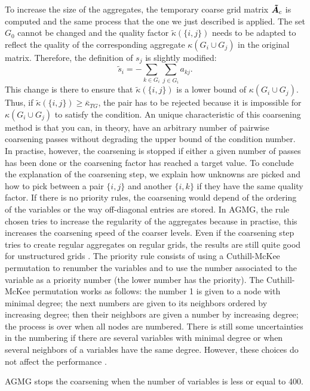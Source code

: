 To increase the size of the aggregates, the temporary coarse grid matrix
$\boldsymbol{\tilde{A}}_c$ is computed and the same process that the one we just
described is applied. The set $G_0$ cannot be changed and the quality factor
$\tilde{\kappa}(\{i,j\})$ needs to be adapted to reflect the quality of the
corresponding aggregate $\kappa(G_i\cup G_j)$ in the original matrix.
Therefore, the definition of $s_j$ is slightly modified:
\begin{equation}
  \tilde{s}_i = - \sum_{k \in G_i} \sum_{j \in G_i} a_{kj}.
\end{equation}
This change is there to ensure that $\tilde{\kappa}(\{i,j\})$ is a lower
bound of $\kappa(G_i \cup G_j)$. Thus, if $\tilde{\kappa}(\{i,j\}) \geq
\bar{\kappa}_{TG}$, the pair has to be rejected because it is impossible for
$\kappa(G_i \cup G_j)$ to satisfy the condition. An unique characteristic 
of this coarsening method is that you can, in theory, have an 
arbitrary number of pairwise coarsening passes without degrading the upper
bound of the condition number. In practise, however, the coarsening is
stopped if either a given number of passes has been done or the coarsening
factor has reached a target value. To conclude the explanation of the
coarsening step, we explain how unknowns are picked and how to pick between 
a pair $\{i,j\}$ and another $\{i,k\}$ if they have the same quality factor. 
If there is no priority rules, the coarsening would depend of the ordering 
of the variables or the way off-diagonal entries are stored. In AGMG, the 
rule chosen tries to increase the regularity of the aggregates because in 
practise, this increases the coarsening speed of the coarser levels. Even 
if the coarsening step tries to create regular aggregates on regular grids, 
the results are still quite good for unstructured grids \cite{agmg2}. The 
priority rule consists of using a Cuthill-McKee permutation 
\cite{cmk} to renumber the variables and to use the number associated to the 
variable as a priority number (the lower number has the priority). The 
Cuthill-McKee permutation works as follows: the number 1 is given to a node 
with minimal degree; the next numbers are given to its neighbors ordered by
increasing degree; then their neighbors are given a number by
increasing degree; the process is over when all nodes are numbered. There is
still some uncertainties in the numbering if there are several variables
with minimal degree or when several neighbors of a variables have the same
degree. However, these choices do not affect the
performance \cite{agmg2}. 

AGMG stops the coarsening when the number of variables is less or equal to
400.
